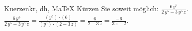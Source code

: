\begin{MAufgabe}{Kuerzen}{kr, dh, MaTeX}
K\"urzen Sie soweit m\"oglich: $\frac{6\, y^5}{2\, y^5 - 3\, y^5\, z}$.\\ 
\ifLsg\MLoesung
\quad $\frac{6\, y^5}{2\, y^5 - 3\, y^5\, z}=\frac{(y^5)\cdot(6)}{(y^5)\cdot(2 - 3\, z)}=\frac{6}{2 - 3\, z}=\frac{-6}{3\, z - 2}$.\else\relax\fi
 \end{MAufgabe}